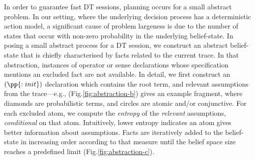 
In order to guarantee fast DT sessions, planning occurs for a small
abstract problem. In our setting, where the underlying decision
process has a deterministic action model, a significant cause of
problem largeness is due to the number of states that occur with
non-zero probability in the underlying belief-state. In posing a small
abstract process for a DT session, we construct an abstract
belief-state that is chiefly characterised by facts related to the
current trace. In that abstraction, instances of operator or sense
declarations whose specification mentions an excluded fact are not
available.
In detail, we first construct an $(\pp{:init})$ declaration which
contains the root term, and relevant assumptions from the trace---e.g., (Fig.\ref{fig:abstraction-b}) gives an example fragment, where
diamonds are probabilistic terms, and circles are atomic and/or
conjunctive.
For each excluded atom, we compute the {\em entropy} of the {\em
relevant}
assumptions, {\em conditional} on that atom. Intuitively, lower
entropy indicates an atom gives better information about
assumptions. Facts are iteratively added to the belief-state in
increasing order according to that measure until the belief space size
reaches a predefined limit (Fig.\ref{fig:abstraction-c}).


